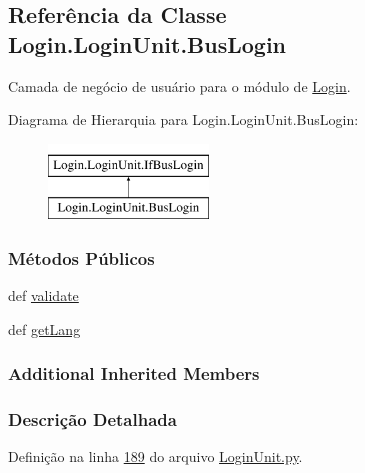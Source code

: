 \hypertarget{classLogin_1_1LoginUnit_1_1BusLogin}{\subsection{Referência da Classe Login.\-Login\-Unit.\-Bus\-Login}
\label{classLogin_1_1LoginUnit_1_1BusLogin}
}


Camada de negócio de usuário para o módulo de \hyperlink{namespaceLogin}{Login}.  


Diagrama de Hierarquia para Login.\-Login\-Unit.\-Bus\-Login\-:\begin{figure}[H]
\begin{center}
\leavevmode
\includegraphics[height=2.000000cm]{d9/d51/classLogin_1_1LoginUnit_1_1BusLogin}
\end{center}
\end{figure}
\subsubsection*{Métodos Públicos}
\begin{DoxyCompactItemize}
\item 
def \hyperlink{classLogin_1_1LoginUnit_1_1BusLogin_a2301425767b811697ce559801b955a58}{validate}
\item 
def \hyperlink{classLogin_1_1LoginUnit_1_1BusLogin_a23223ddd567bf874e6230efaf4912e98}{get\-Lang}
\end{DoxyCompactItemize}
\subsubsection*{Additional Inherited Members}


\subsubsection{Descrição Detalhada}


Definição na linha \hyperlink{LoginUnit_8py_source_l00189}{189} do arquivo \hyperlink{LoginUnit_8py_source}{Login\-Unit.\-py}.



